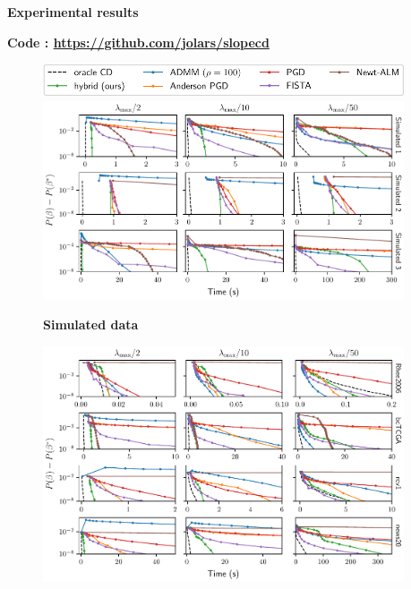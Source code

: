 \documentclass[english,final,t]{beamer}
\begin{document}
\begin{frame}{}
\begin{columns}[t]
\begin{column}{.32\linewidth}
\begin{block}{\textbf{\color{malgared}{\#3 Algorithm}}}
		\end{block}
	\end{column}
	\begin{column}{.3\linewidth}
		\begin{block}{\textbf{\color{malgared}Experimental results}}
			\begin{center}
					\begin{minipage}{0.9\linewidth}
					\begin{beamerboxesrounded}[lower=headerCol]{}
						\textbf{Code : \url{https://github.com/jolars/slopecd}}
					\end{beamerboxesrounded}
				\end{minipage}
			\end{center}
			\begin{figure}[tb]
				\includegraphics[width=0.7\linewidth]{./images/simulated_legend.pdf}
				\includegraphics[width=0.8\linewidth]{./images/simulated.pdf}

				\textbf{Simulated data}
			\end{figure}
			\vspace{.5em}

			\begin{figure}[tb]
				\includegraphics[width=0.8\linewidth]{./images/real.pdf}


\end{figure}
\end{block}
\end{column}
\end{columns}
\end{frame}
\end{document}
